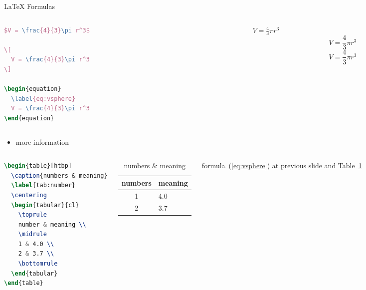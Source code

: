 \documentclass{article}
\begin{document}
\begin{frame}[fragile]{\LaTeX{} Formulas}
    \begin{columns}
        \begin{column}{.55\textwidth}
\begin{lstlisting}[language=TeX]
$V = \frac{4}{3}\pi r^3$

\[
  V = \frac{4}{3}\pi r^3
\]

\begin{equation}
  \label{eq:vsphere}
  V = \frac{4}{3}\pi r^3
\end{equation}
\end{lstlisting}
        \end{column}
        \begin{column}{.4\textwidth}
            $V = \frac{4}{3}\pi r^3$
            \[
                V = \frac{4}{3}\pi r^3
            \]
            \begin{equation}
                \label{eq:vsphere}
                V = \frac{4}{3}\pi r^3
            \end{equation}
        \end{column}
    \end{columns}
    \begin{itemize}
        \item more information \href{https://ja.overleaf.com/learn/latex/Mathematical_expressions}{\color{purple}{here}}
    \end{itemize}
\end{frame}

\begin{frame}[fragile]
    \begin{columns}
\begin{lstlisting}[language=TeX]
\begin{table}[htbp]
  \caption{numbers & meaning}
  \label{tab:number}
  \centering
  \begin{tabular}{cl}
    \toprule
    number & meaning \\
    \midrule
    1 & 4.0 \\
    2 & 3.7 \\
    \bottomrule
  \end{tabular}
\end{table}
\end{lstlisting}
        \begin{table}[htpb]
            \centering
            \caption{numbers \& meaning}
            \label{tab:number}
            \begin{tabular}{cl}\toprule
                numbers & meaning \\\midrule
                1 & 4.0\\
                2 & 3.7\\\bottomrule
            \end{tabular}
        \end{table}
        \normalsize formula~(\ref{eq:vsphere}) at previous slide and Table~\ref{tab:number} 
    \end{columns}
\end{frame}
\end{document}
